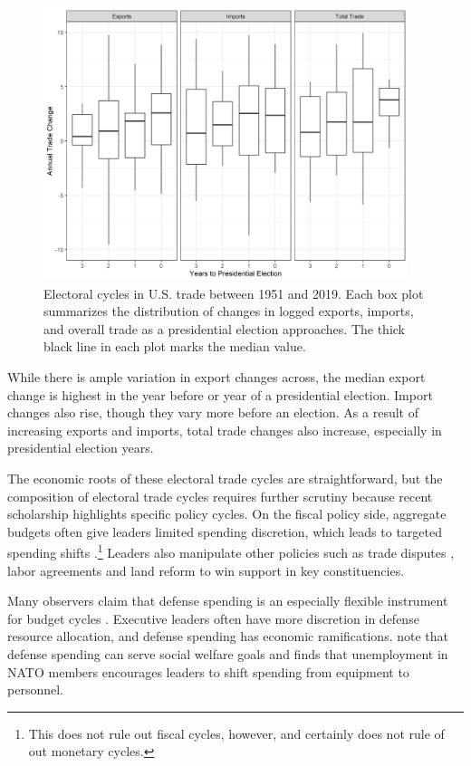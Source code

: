 \documentclass[12pt]{article}
\begin{document}
\begin{figure}
\centering
\includegraphics[width=0.95\textwidth]{../figures/us-trade-cycles.png}
\caption{Electoral cycles in U.S. trade between 1951 and 2019. Each box plot summarizes the distribution of changes in logged exports, imports, and overall trade as a presidential election approaches. The thick black line in each plot marks the median value.}
\label{fig:us-trade-cycles}
\end{figure}


While there is ample variation in export changes across, the median export change is highest in the year before or year of a presidential election.
Import changes also rise, though they vary more before an election. 
As a result of increasing exports and imports, total trade changes also increase, especially in presidential election years.


The economic roots of these electoral trade cycles are straightforward, but the composition of electoral trade cycles requires further scrutiny because recent scholarship highlights specific policy cycles. 
On the fiscal policy side, aggregate budgets often give leaders limited spending discretion, which leads to targeted spending shifts \citep[pg. 248]{Dubois2016}.\footnote{This does not rule out fiscal cycles, however, and certainly does not rule of out monetary cycles.} 
Leaders also manipulate other policies such as trade disputes \citep{Conconietal2017}, labor agreements \citep{Ahlquist2010} and land reform \cite{Philips2020} to win support in key constituencies.


Many observers claim that defense spending is an especially flexible instrument for budget cycles \citep{Tufte1978, Mintz1988}.
Executive leaders often have more discretion in defense resource allocation, and defense spending has economic ramifications.
\citet{WhittenWilliams2011} note that defense spending can serve social welfare goals and \citet{Becker2021} finds that unemployment in NATO members encourages leaders to shift spending from equipment to personnel.
\end{document}

